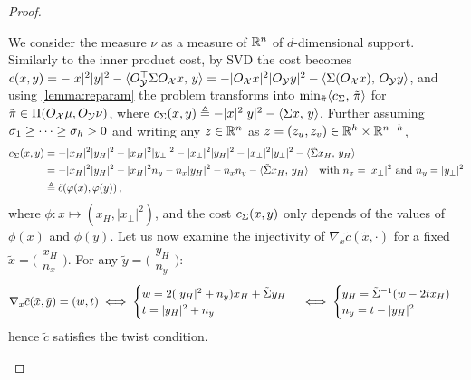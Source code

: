 \begin{proof}
\begin{enumerate}[label=(\roman*)]
                We consider the measure $\nu$ as a measure of $\mathbb{R}^n$ of $d$-dimensional support.
                Similarly to the inner product cost, by SVD the cost becomes $c(x, y)=-|x|^2|y|^2-\langle \smash{O_{\mathcal{Y}}^\top}\Sigma O_{\mathcal{X}} x,\,y\rangle =-|O_{\mathcal{X}} x|^2|O_{\mathcal{Y}} y|^2-\langle \Sigma (O_{\mathcal{X}} x),\, O_{\mathcal{Y}} y\rangle$,
                and using \cref{lemma:reparam} the problem transforms into $\min_{\tilde\pi} \langle c_\Sigma,\, \tilde\pi\rangle$ for $\tilde\pi \in \Pi(O_{\mathcal{X}}\mu, O_{\mathcal{Y}}\nu)$, where $c_\Sigma(x,y)\triangleq -|x|^2|y|^2-\langle \Sigma x,\, y\rangle$.
                Further assuming $\sigma_1 \geq \dots \geq \sigma_h>0$ and writing any $z\in\mathbb{R}^n$ as $z=(z_u,z_v)\in\mathbb{R}^h\times\mathbb{R}^{n-h}$,
                \begin{align*}
                c_\Sigma(x,y) & =-|x_H|^{2}|y_H|^{2}-|x_H|^{2}|y_\perp|^{2}-|x_\perp|^{2}|y_H|^{2}-|x_\perp|^{2}|y_\perp|^{2}-\langle \tilde {\Sigma} x_H,\, y_H\rangle\\
                     & =-|x_H|^{2}|y_H|^{2}-|x_H|^{2}n_y-n_x|y_H|^{2}-n_xn_y-\langle \tilde {\Sigma} x_H,\, y_H\rangle  \quad \text{with }n_x=|x_\perp|^2 \text{ and }n_y=|y_\perp|^2\\
                     & \triangleq \tilde c(\varphi(x),\varphi(y))\,,
                \end{align*}
                where $\phi: x\mapsto (x_H,|x_\perp|^2)$, and the cost $c_\Sigma(x,y)$ only depends of the values of $\phi(x)$ and $\phi(y)$. Let us now examine the injectivity of $\nabla_{x}\tilde c(\tilde x,\cdot)$ for a fixed $\tilde x=\big(\begin{smallmatrix}x_H\\n_x\end{smallmatrix}\big)$. For any $\tilde y=\big(\begin{smallmatrix}y_H\\n_y\end{smallmatrix}\big)$:
                $$\nabla_{x}\tilde c(\tilde x,\tilde y)= (w,t)  \iff
                \begin{cases}
                    w=2(|y_H|^{2}+n_y)x_H+\tilde {\Sigma} y_H \\
                    t=|y_H|^{2}+n_y
                    \end{cases} \iff \begin{cases}
                    y_H=\tilde {\Sigma} ^{-1}(w-2tx_H) \\
                    n_y=t-|y_H|^{2}
                    \end{cases}$$
                hence $\tilde c$ satisfies the twist condition.


\end{enumerate}
\end{proof}

